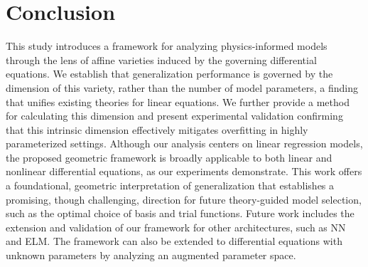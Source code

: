 \documentclass{article}
\theoremstyle{plain}
\theoremstyle{definition}
\theoremstyle{remark}
\begin{document}
\section{Conclusion}
This study introduces a framework for analyzing physics-informed models through the lens of affine varieties induced by the governing differential equations. We establish that generalization performance is governed by the dimension of this variety, rather than the number of model parameters, a finding that unifies existing theories for linear equations. We further provide a method for calculating this dimension and present experimental validation confirming that this intrinsic dimension effectively mitigates overfitting in highly parameterized settings. Although our analysis centers on linear regression models, the proposed geometric framework is broadly applicable to both linear and nonlinear differential equations, as our experiments demonstrate. This work offers a foundational, geometric interpretation of generalization that establishes a promising, though challenging, direction for future theory-guided model selection, such as the optimal choice of basis and trial functions. Future work includes the extension and validation of our framework for other architectures, such as NN and ELM. The framework can also be extended to differential equations with unknown parameters by analyzing an augmented parameter space.





\newpage
\appendix
\end{document}

